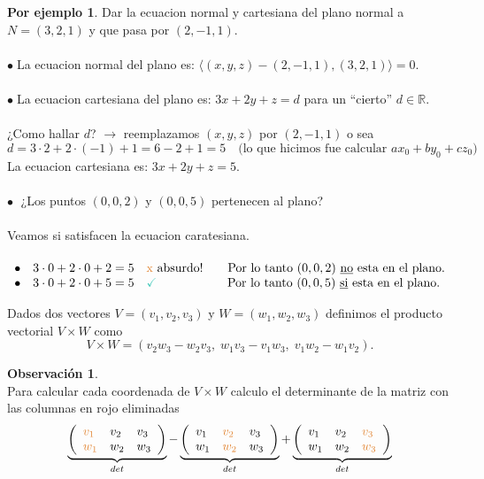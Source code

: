 \documentclass{article}
\theoremstyle{definition}
\newtheorem*{obs}{Observación}
\newtheorem*{ej}{Por ejemplo}
\theoremstyle{remark}
\newcommand\bl{$\bullet\;$}
\newcommand\ok{\checkmark}
\begin{document}
\begin{ej}
  Dar la ecuacion normal y cartesiana del plano normal a \\ $N=(3,2,1)$ y que pasa por $(2,-1,1)$. \\\\ \bl La ecuacion normal del plano es: $ \langle (x,y,z)-(2,-1,1),(3,2,1) \rangle = 0 $. \\ \\ 
  \bl La ecuacion cartesiana del plano es: $3x+2y+z=d$ para un ``cierto'' $d \in \mathbb{R}$.
  \\\\
  ¿Como hallar $d$? $\to$ reemplazamos $(x,y,z)$ por $(2,-1,1)$ o sea \[ 
  d=3\cdot 2 + 2 \cdot (-1) + 1 = 6 - 2 + 1 = 5 \quad \text{(lo que hicimos fue calcular } ax_0+by_0+cz_0 \text{)}
  \] La ecuacion cartesiana es: $3x+2y+z=5$.
  \\\\ \textcolor{rojop2}{\bl} ¿Los puntos $(0,0,2)$ y $(0,0,5)$ pertenecen al plano? \\\\ Veamos si satisfacen la ecuacion caratesiana.\\\\ $\begin{array}{llll}
    \bullet \quad 3 \cdot 0 + 2 \cdot 0 + 2 = 5 \quad \text{\textcolor{rojop2}{x} absurdo!} \quad \quad \text{Por lo tanto } (0,0,2) \text{ \underline{no}  esta en el plano.} \\     \bullet \quad 3 \cdot 0 + 2 \cdot 0 + 5 = 5 \quad \text{\textcolor{verdep2}{\ok}\phantom{absurdo!}} \quad \quad \text{Por lo tanto } (0,0,5) \text{ \underline{si}  esta en el plano.}
 \end{array}$
\end{ej}

\begin{defi}
  Dados dos vectores $V=(v_1,v_2,v_3)$ y $W=(w_1,w_2,w_3)$ definimos el producto vectorial $V \times W $ como \[
  V \times W = (v_2w_3-w_2v_3,\; w_1v_3-v_1w_3, \; v_1w_2-w_1v_2).
  \]
\end{defi}
\begin{obs} \; \\ Para calcular cada coordenada de $V \times W$ calculo el determinante de la matriz con las columnas en rojo eliminadas\\
  $$\underbrace{\left(\begin{array}{lll}
      \textcolor{rojop2}{v_1} & v_2 & v_3 \\ 
      \textcolor{rojop2}{w_1} & w_2 & w_3 
\end{array}\right)}_{det}
  -
  \underbrace{\left(\begin{array}{lll} 
      v_1 & \textcolor{rojop2}{v_2} & v_3 \\ 
      w_1 & \textcolor{rojop2}{w_2} & w_3 
\end{array}\right)}_{det}
  +
  \underbrace{\left(\begin{array}{lll}
      v_1 & v_2 & \textcolor{rojop2}{v_3} \\ 
        w_1 & w_2 & \textcolor{rojop2}{w_3} 
  \end{array}\right)}_{det}$$
\end{obs}
\end{document}
